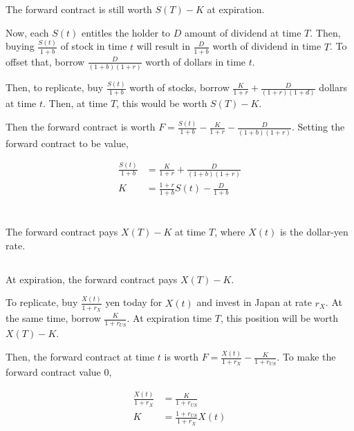 \documentclass[11pt]{scrartcl}
\begin{document}
\section{}

The forward contract is still worth $S(T) - K$ at expiration.

Now, each $S(t)$ entitles the holder to $D$ amount of dividend at time $T$. Then, buying $\frac{S(t)}{1+b}$ of stock in time $t$ will result in $\frac{D}{1+b}$ worth of dividend in time $T$. To offset that, borrow $\frac{D}{(1+b)(1+r)}$ worth of dollars in time $t$.

Then, to replicate, buy $\frac{S(t)}{1+b}$ worth of stocks, borrow $\frac{K}{1+r} + \frac{D}{(1+r)(1+d)}$ dollars at time $t$. Then, at time $T$, this would be worth $S(T) - K$.

Then the forward contract is worth $F = \frac{S(t)}{1+b} - \frac{K}{1+r} - \frac{D}{(1+b)(1+r)}$. Setting the forward contract to be value,

\begin{align*}
\frac{S(t)}{1+b} &= \frac{K}{1+r} + \frac{D}{(1+b)(1+r)} \\
K &= \frac{1+r}{1+b}S(t) - \frac{D}{1+b}
\end{align*}

\section{}

The forward contract pays $X(T) - K$ at time $T$, where $X(t)$ is the dollar-yen rate.

\subsection{}

At expiration, the forward contract pays $X(T) - K$.

To replicate, buy $\frac{X(t)}{1+r_X}$ yen today for $X(t)$ and invest in Japan at rate $r_X$. At the same time, borrow $\frac{K}{1+r_{US}}$. At expiration time $T$, this position will be worth $X(T) - K$.

Then, the forward contract at time $t$ is worth $F = \frac{X(t)}{1+r_X} - \frac{K}{1+r_{US}}$. To make the forward contract value 0,

\begin{align*}
\frac{X(t)}{1+r_X} &= \frac{K}{1+r_{US}} \\
K &= \frac{1+r_{US}}{1+r_X}X(t)
\end{align*}
\end{document}
